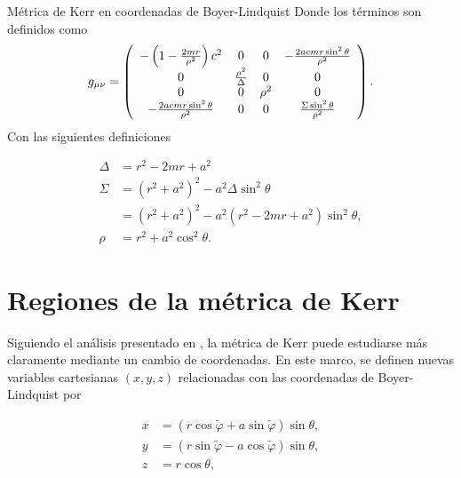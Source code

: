 \begin{definition}{Métrica de Kerr en coordenadas de Boyer-Lindquist}{}
    Donde los términos son definidos como
    \begin{equation}
        g_{\mu \nu}=\left(
        \begin{array}{cccc}
                -\left(1-\frac{2 mr}{\rho^2}\right) c^2 & 0                     & 0      & - \frac{2a c mr \sin^2\theta}{\rho^2} \\
                0                                       & \frac{\rho^2}{\Delta} & 0      & 0                                     \\
                0                                       & 0                     & \rho^2 & 0                                     \\
                -\frac{2a c mr \sin^2\theta}{\rho^2}    & 0                     & 0      & \frac{\Sigma \sin^2\theta}{\rho^2}
            \end{array}
        \right).
        \label{eq:covariantKerrMetric}
    \end{equation}
    Con las siguientes definiciones

    \begin{equation}
        \begin{aligned}
            \Delta & = r^2 - 2mr + a^2                                              \\
            \Sigma & = \left(r^2+a^2\right)^2-a^2 \Delta \sin ^2 \theta             \\
                   & =\left(r^2+a^2\right)^2-a^2 (r^2 - 2mr + a^2) \sin ^2 \theta , \\
            \rho   & = r^2+a^2 \cos ^2 \theta.
        \end{aligned}
    \end{equation}
\end{definition}

\section{Regiones de la métrica de Kerr}

Siguiendo el análisis presentado en \cite{chandrasekhar-1983}, la métrica de Kerr puede estudiarse más claramente mediante un cambio de coordenadas. En este marco, se definen nuevas variables cartesianas $(x,y,z)$ relacionadas con las coordenadas de Boyer-Lindquist por

\begin{equation}
    \begin{aligned}
        x & = (r \cos \tilde{\varphi}+a \sin \tilde{\varphi}) \sin \theta, \\
        y & = (r \sin \tilde{\varphi}-a \cos \tilde{\varphi}) \sin \theta, \\
        z & = r \cos \theta,
    \end{aligned}
\end{equation}

